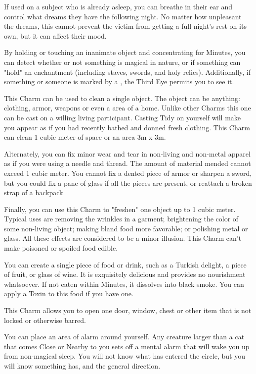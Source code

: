   If used on a subject who is already asleep, you can breathe in their ear and control what dreams they have the following night. No matter how unpleasant the dreams, this cannot prevent the victim from getting a full night’s rest on its own, but it can affect their mood.


  By holding or touching an inanimate object and concentrating for Minutes, you can detect whether or not something is magical in nature, or if something can "hold" an enchantment (including staves, swords, and holy relics). Additionally, if something or someone is marked by a , the Third Eye permits you to see it.


  This Charm can be used to clean a single object. The object can be anything: clothing, armor, weapons or even a area of a home. Unlike other Charms this one can be cast on a willing living participant. Casting Tidy on yourself will make you appear as if you had recently bathed and donned fresh clothing. This Charm can clean 1 cubic meter of space or an area 3m x 3m. 

  Alternately, you can fix minor wear and tear in non-living and non-metal apparel as if you were using a needle and thread.  The amount of material mended cannot exceed 1 cubic meter.  You cannot fix a dented piece of armor or sharpen a sword, but you could fix a pane of glass if all the pieces are present, or reattach a broken strap of a backpack

  Finally, you can use this Charm to "freshen" one object up to 1 cubic meter. Typical uses are removing the wrinkles in a garment; brightening the color of some non-living object; making bland food more favorable; or polishing metal or glass. All these effects are considered to be a minor illusion. This Charm can't make poisoned or spoiled food edible. 


  You can create a single piece of food or drink, such as a Turkish delight, a piece of fruit, or glass of wine. It is exquisitely delicious and provides no nourishment whatsoever. If not eaten within Minutes, it dissolves into black smoke.  You can apply a Toxin to this food if you have one.

  \cbreak


  This Charm allows you to open one door, window, chest or other item that is not locked or otherwise barred. 


  You can place an area of alarm around yourself.  Any creature larger than a cat that comes Close or Nearby to you sets off a mental alarm that will wake you up from non-magical sleep.  You will not know what has entered the circle, but you will know something has, and the general direction.



